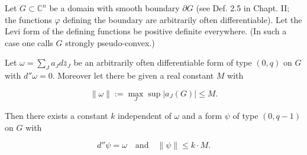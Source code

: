 Let $G \subset \mathbb{C}^n$ be a domain with smooth boundary $\partial G$ (see Def. 2.5 in Chapt. II; the functions $\varphi$ defining the boundary are arbitrarily often differentiable). Let the Levi form of the defining functions be positive definite everywhere. (In such a case one calls $G$ strongly pseudo-convex.)

Let $\omega = \sum_J a_J d\bar{z}_J$ be an arbitrarily often differentiable form of type $(0, q)$ on $G$ with $d''\omega = 0$. Moreover let there be given a real constant $M$ with

$$\|\omega\| := \max_J \sup|a_J(G)| \leqslant M.$$

Then there exists a constant $k$ independent of $\omega$ and a form $\psi$ of type $(0, q - 1)$ on $G$ with

$$d''\psi = \omega \quad \text{and} \quad \|\psi\| \leqslant k \cdot M.$$
